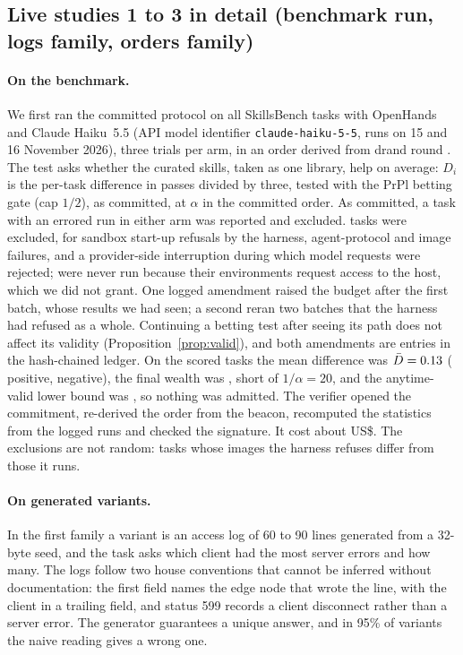 \subsection{Live studies 1 to 3 in detail (benchmark run, logs family, orders family)}
\label{app:live-detail}
\paragraph{On the benchmark.} We first ran the committed protocol on all \NLoTasks{} SkillsBench tasks with OpenHands and Claude Haiku~5.5 (API model identifier \texttt{claude-haiku-5-5}, runs on 15 and 16 November 2026), three trials per arm, in an order derived from drand round \NLoRound. The test asks whether the curated skills, taken as one library, help on average: $D_i$ is the per-task difference in passes divided by three, tested with the PrPl betting gate (cap $1/2$), as committed, at $\alpha$ in the committed order. As committed, a task with an errored run in either arm was reported and excluded. \NLoExcluded{} tasks were excluded, for sandbox start-up refusals by the harness, agent-protocol and image failures, and a provider-side interruption during which model requests were rejected; \NLoMissing{} were never run because their environments request access to the host, which we did not grant. One logged amendment raised the budget after the first batch, whose results we had seen; a second reran two batches that the harness had refused as a whole. Continuing a betting test after seeing its path does not affect its validity (Proposition~\ref{prop:valid}), and both amendments are entries in the hash-chained ledger. On the \NLoScored{} scored tasks the mean difference was $\bar D=0.13$ (\NLoPos{} positive, \NLoNeg{} negative), the final wealth was \NLoWealth, short of $1/\alpha=20$, and the anytime-valid lower bound was \NLoLcb, so nothing was admitted. The verifier opened the commitment, re-derived the order from the beacon, recomputed the statistics from the \NLoRuns{} logged runs and checked the signature. It cost about US\$\NLoCost. The exclusions are not random: tasks whose images the harness refuses differ from those it runs.

\paragraph{On generated variants.} In the first family a variant is an access log of 60 to 90 lines generated from a 32-byte seed, and the task asks which client had the most server errors and how many. The logs follow two house conventions that cannot be inferred without documentation: the first field names the edge node that wrote the line, with the client in a trailing field, and status 599 records a client disconnect rather than a server error. The generator guarantees a unique answer, and in 95\% of variants the naive reading gives a wrong one.

